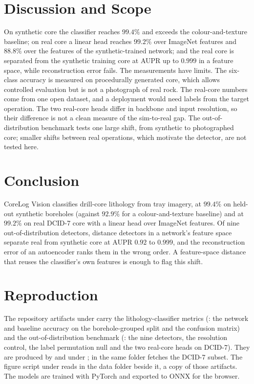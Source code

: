 \documentclass[journal]{IEEEtran}
\begin{document}
\section{Discussion and Scope}\label{sec:discuss}

On synthetic core the classifier reaches $99.4\%$ and exceeds the colour-and-texture baseline; on real core a linear
head reaches $99.2\%$ over ImageNet features and $88.8\%$ over the features of the synthetic-trained network; and the
real core is separated from the synthetic training core at AUPR up to $0.999$ in a feature space, while
reconstruction error fails. The measurements have limits. The six-class accuracy is measured on procedurally
generated core, which allows controlled evaluation but is not a photograph of real rock. The real-core numbers come
from one open dataset, and a deployment would need labels from the target operation. The two real-core heads differ
in backbone and input resolution, so their difference is not a clean measure of the sim-to-real gap. The
out-of-distribution benchmark tests one large shift, from synthetic to photographed core; smaller shifts between
real operations, which motivate the detector, are not tested here.

\section{Conclusion}

CoreLog Vision classifies drill-core lithology from tray imagery, at $99.4\%$ on held-out synthetic boreholes
(against $92.9\%$ for a colour-and-texture baseline) and at $99.2\%$ on real DCID-7 core with a linear head over
ImageNet features. Of nine out-of-distribution detectors, distance detectors in a network's feature space separate
real from synthetic core at AUPR $0.92$ to $0.999$, and the reconstruction error of an autoencoder ranks them in the
wrong order. A feature-space distance that reuses the classifier's own features is enough to flag this shift.

\appendices
\section{Reproduction}\label{app:repro}

The repository artifacts under  carry the lithology-classifier metrics (:
the network and baseline accuracy on the borehole-grouped split and the confusion matrix) and the
out-of-distribution benchmark (: the nine detectors, the resolution control, the label
permutation null and the two real-core heads on DCID-7). They are produced by  and
 under ;  in the same folder fetches the
DCID-7 subset. The figure script under  reads  in the data
folder beside it, a copy of those artifacts. The models are trained with PyTorch and exported to ONNX for the
browser.
\end{document}
